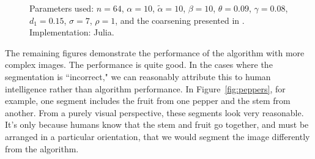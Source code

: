 \documentclass[12pt]{article}%
\begin{document}
\begin{figure}[ht]
\caption{Parameters used: $n = 64$, $\alpha = 10$, $\tilde{\alpha} = 10$, $\beta = 10$, $\theta = 0.09$, $\gamma = 0.08$, $d_1 = 0.15$, $\sigma = 7$, $\rho = 1$, and the coarsening presented in \cite{inglis:2010}.  Implementation: Julia.}
\label{fig:spiral}

\end{figure}

The remaining figures demonstrate the performance of the algorithm with more complex images. The performance is quite good. In the cases where the segmentation is ``incorrect," we can reasonably attribute this to human intelligence rather than algorithm performance. In Figure~\ref{fig:peppers}, for example, one segment includes the fruit from one pepper and the stem from another. From a purely visual perspective, these segments look very reasonable. It's only because humans know that the stem and fruit go together, and must be arranged in a particular orientation, that we would segment the image differently from the algorithm.\\
\end{document}
